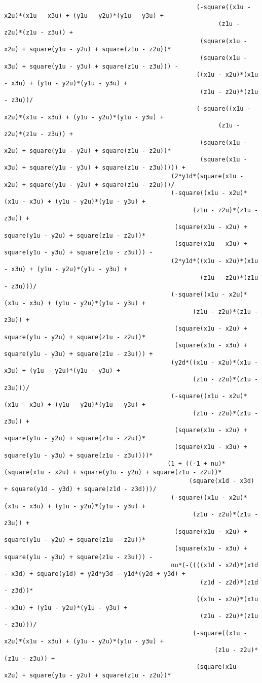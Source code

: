 \begin{lstlisting}
													 (-square((x1u - x2u)*(x1u - x3u) + (y1u - y2u)*(y1u - y3u) + 
														   (z1u - z2u)*(z1u - z3u)) + 
													  (square(x1u - x2u) + square(y1u - y2u) + square(z1u - z2u))*
													  (square(x1u - x3u) + square(y1u - y3u) + square(z1u - z3u))) - 
													 ((x1u - x2u)*(x1u - x3u) + (y1u - y2u)*(y1u - y3u) + 
													  (z1u - z2u)*(z1u - z3u))/
													 (-square((x1u - x2u)*(x1u - x3u) + (y1u - y2u)*(y1u - y3u) + 
														   (z1u - z2u)*(z1u - z3u)) + 
													  (square(x1u - x2u) + square(y1u - y2u) + square(z1u - z2u))*
													  (square(x1u - x3u) + square(y1u - y3u) + square(z1u - z3u))))) + 
											  (2*y1d*(square(x1u - x2u) + square(y1u - y2u) + square(z1u - z2u)))/
											  (-square((x1u - x2u)*(x1u - x3u) + (y1u - y2u)*(y1u - y3u) + 
													(z1u - z2u)*(z1u - z3u)) + 
											   (square(x1u - x2u) + square(y1u - y2u) + square(z1u - z2u))*
											   (square(x1u - x3u) + square(y1u - y3u) + square(z1u - z3u))) - 
											  (2*y1d*((x1u - x2u)*(x1u - x3u) + (y1u - y2u)*(y1u - y3u) + 
													  (z1u - z2u)*(z1u - z3u)))/
											  (-square((x1u - x2u)*(x1u - x3u) + (y1u - y2u)*(y1u - y3u) + 
													(z1u - z2u)*(z1u - z3u)) + 
											   (square(x1u - x2u) + square(y1u - y2u) + square(z1u - z2u))*
											   (square(x1u - x3u) + square(y1u - y3u) + square(z1u - z3u))) + 
											  (y2d*((x1u - x2u)*(x1u - x3u) + (y1u - y2u)*(y1u - y3u) + 
													(z1u - z2u)*(z1u - z3u)))/
											  (-square((x1u - x2u)*(x1u - x3u) + (y1u - y2u)*(y1u - y3u) + 
													(z1u - z2u)*(z1u - z3u)) + 
											   (square(x1u - x2u) + square(y1u - y2u) + square(z1u - z2u))*
											   (square(x1u - x3u) + square(y1u - y3u) + square(z1u - z3u))))*
											 (1 + ((-1 + nu)*(square(x1u - x2u) + square(y1u - y2u) + square(z1u - z2u))*
												   (square(x1d - x3d) + square(y1d - y3d) + square(z1d - z3d)))/
											  (-square((x1u - x2u)*(x1u - x3u) + (y1u - y2u)*(y1u - y3u) + 
													(z1u - z2u)*(z1u - z3u)) + 
											   (square(x1u - x2u) + square(y1u - y2u) + square(z1u - z2u))*
											   (square(x1u - x3u) + square(y1u - y3u) + square(z1u - z3u))) - 
											  nu*(-((((x1d - x2d)*(x1d - x3d) + square(y1d) + y2d*y3d - y1d*(y2d + y3d) + 
													  (z1d - z2d)*(z1d - z3d))*
													 ((x1u - x2u)*(x1u - x3u) + (y1u - y2u)*(y1u - y3u) + 
													  (z1u - z2u)*(z1u - z3u)))/
													(-square((x1u - x2u)*(x1u - x3u) + (y1u - y2u)*(y1u - y3u) + 
														  (z1u - z2u)*(z1u - z3u)) + 
													 (square(x1u - x2u) + square(y1u - y2u) + square(z1u - z2u))*

\end{lstlisting}
